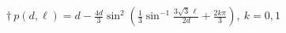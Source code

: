 \documentclass{article}
\begin{document}
\begin{center}
\newpage

\section*{}
\noindent{}
\Large{
$\dagger\ p(d,\ell) =d-\frac{4d}{3} \sin^2
  \left(
    \frac{1}{3} \sin^{-1} \frac{3\sqrt{3}\, \ell}{2d}+\frac{2k\pi}{3}
  \right),\ k=0,1$}
\newpage
\end{center}
\end{document}
